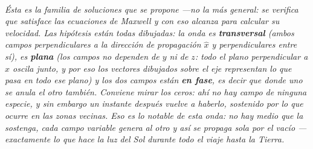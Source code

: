 \providecommand{\campos}[1]{%
  \pgfmathsetmacro{\amp}{sin(deg(#1))}%
  \draw[figvec] (#1,0) -- (#1,{1.35*\amp});
  \draw[figvecres] (#1,0) -- ({#1-0.45*\amp},{-0.32*\amp});}
\begin{center}
\\[0.5em]
{\small\itshape Ésta es la familia de soluciones que se propone ---no la más
general: se verifica que satisface las ecuaciones de Maxwell y con eso alcanza
para calcular su velocidad. Las hipótesis están todas dibujadas: la onda es
\textbf{transversal} (ambos campos perpendiculares a la dirección de
propagación $\hat x$ y perpendiculares entre sí), es \textbf{plana} (los campos
no dependen de $y$ ni de $z$: todo el plano perpendicular a $\hat x$ oscila
junto, y por eso los vectores dibujados sobre el eje representan lo que pasa en
todo ese plano) y los dos campos están \textbf{en fase}, es decir que donde uno
se anula el otro también. Conviene mirar los ceros: ahí no hay campo de ninguna
especie, y sin embargo un instante después vuelve a haberlo, sostenido por lo
que ocurre en las zonas vecinas. Eso es lo notable de esta onda: no hay medio
que la sostenga, cada campo variable genera al otro y así se propaga sola por el
vacío ---exactamente lo que hace la luz del Sol durante todo el viaje hasta la
Tierra.}
\end{center}
